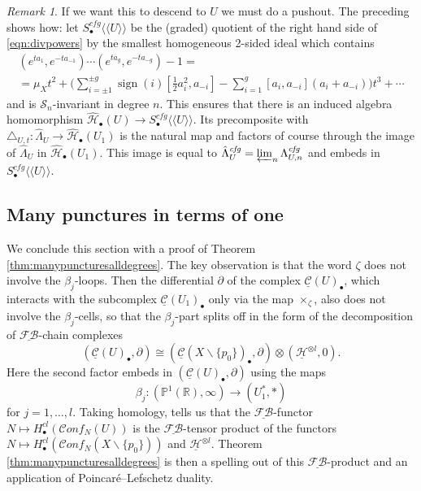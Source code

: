 \documentclass[12pt,letterpaper]{amsart}
\numberwithin{equation}{section}
\def\PP{{\mathbb P}}
\def\RR{{\mathbb R}}
\def\ssm{\smallsetminus}
\def\tri{\triangle}
\def\Hcal{{\mathcal H}}
\def\Scal{{\mathcal S}}
\def\uHcal{{\underline\Hcal}}
\newcommand\FB{\underline{\mathcal {F\!B}}}
\def\Cscr{{\mathscr C}}
\def\lla{\langle\!\langle}
\def\rra{\rangle\!\rangle}
\def\pt{{\scriptscriptstyle\bullet}}
\newcommand\conf{\mathscr{C}\!\mathit{onf}\!}
\newcommand\cfg{\mathit{cfg}}
\newcommand\sign{\operatorname{sign}}
\theoremstyle{remark}
\newtheorem{remark}[theorem]{Remark}
\begin{document}
\begin{remark}
If we want this to descend to $U$ we must do a pushout. The preceding shows how: let  $S^\cfg_\pt\lla  U\rra$ be the (graded) quotient of the right hand side of \eqref{eqn:divpowers} by the smallest homogeneous 2-sided ideal which contains 
\begin{multline*}
(e^{ta_1}, e^{-ta_{-1}})\cdots (e^{ta_g}, e^{-ta_{-g}})-1=\\
\textstyle =\mu_Xt^2+  \big( \sum_{i=\pm 1}^{\pm g} \sign (i)[\frac{1}{2}a_i^2, a_{-i}] -\sum_{i=1}^g [a_i,a_{-i}](a_i+a_{-i}) \big)t^3+\cdots 
\end{multline*}
and  is $\Scal_n$-invariant in degree $n$. This ensures that there is an induced algebra  homomorphism 
$\widehat \Hcal_\pt(U)\to S^\cfg_\pt\lla  U\rra$. Its precomposite with $\tri_{U, t}: \hat\Lambda_{U}\to \widehat \Hcal_\pt(U_1)$ is the natural map
and factors of course through the image of $\hat\Lambda_{U}$ in $ \widehat \Hcal_\pt(U_1)$. 
This image  is equal to $\hat\Lambda^\cfg_{U}=\varprojlim_n\Lambda^\cfg_{U,n}$ and embeds in $S^\cfg_\pt\lla  U\rra$. 
\end{remark}

\subsection{Many punctures in terms of one}\label{sec:manypunctures}
We conclude this section with a proof of Theorem \ref{thm:manypuncturesalldegrees}. The key observation is that the word $\zeta$ does not involve the $\beta_j$-loops. Then the differential $\partial$ of the complex $\underline{\Cscr}(U)_\pt$, which interacts with the subcomplex $\underline{\Cscr}(U_1)_\pt$ only via the map $\times_{\zeta}$, also does not involve the $\beta_j$-cells, so that the $\beta_j$-part splits off in the form of the decomposition of $\FB$-chain complexes 
\begin{equation}\label{eq:decompositionmanypunctures}
    (\underline{\Cscr}(U)_\pt, \partial)\cong (\underline{\Cscr}(X\ssm \{p_0\})_\pt, \partial)\otimes (\uHcal^{\otimes l}, 0).
\end{equation}
Here the second factor embeds in $(\underline{\Cscr}(U)_\pt, \partial)$ using the maps $$\beta_j:(\PP^1(\RR),\infty)\to (U_1^*, *)$$ for $j=1,\ldots, l$.
Taking homology, tells us that the $\FB$-functor  $N\mapsto H^{cl}_\pt(\conf_N (U))$ is the $\FB$-tensor product of the functors $N\mapsto H^{cl}_\pt( \conf_N (X\ssm \{p_0\}))$ and $\uHcal^{\otimes l}$. Theorem \ref{thm:manypuncturesalldegrees} is then a spelling out of this $\FB$-product and an application of  Poincar\'e--Lefschetz duality.
\end{document}
